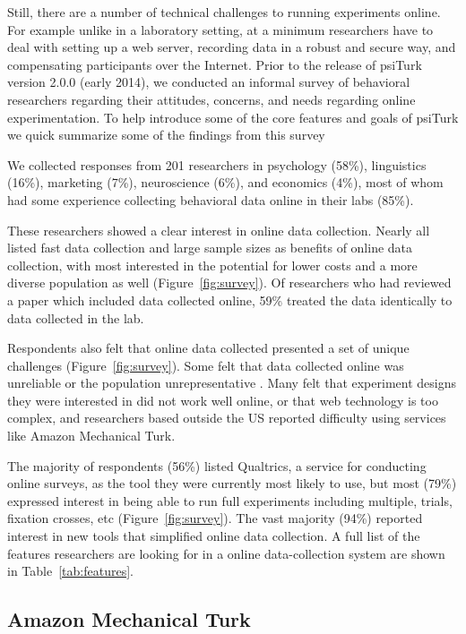 \documentclass[twocolumn]{svjour3}          %
\begin{document}
Still, there are a number of technical challenges to running experiments online.
For example unlike in a laboratory setting, at a minimum researchers have to 
deal with setting up a web server, recording data in a robust and secure way, 
and compensating participants over the Internet.  
Prior to the release of \textsf{psiTurk} version
2.0.0 (early 2014), we conducted an informal survey of behavioral researchers 
regarding their attitudes, concerns, and needs regarding online experimentation. 
To help introduce some of the core features and goals of \textsf{psiTurk} we 
quick summarize some of the findings from this survey

 We collected responses from 201 researchers in psychology (58\%),
linguistics (16\%), marketing (7\%), neuroscience (6\%), and economics (4\%), most of whom had some
experience collecting behavioral data online in their labs (85\%).

These researchers showed a clear interest in online data collection. Nearly all listed fast data
collection and large sample sizes as benefits of online data collection, with most
interested in the potential for lower costs and a more diverse population as well (Figure~\ref{fig:survey}). Of researchers who had reviewed a paper which included data collected online, 59\% treated the data identically to data collected in the lab.


Respondents also felt that online data collected presented a set of unique challenges (Figure~\ref{fig:survey}). 
Some felt that data collected online was unreliable or the
population unrepresentative . Many felt that experiment designs they were interested in did
not work well online, or that web technology is too complex, and researchers based
outside the US reported difficulty using services like Amazon Mechanical Turk.


The majority of respondents (56\%) listed Qualtrics, a service for conducting online surveys, as the tool they
were currently most likely to use, but most (79\%) expressed interest in being able to run full
experiments including multiple, trials, fixation crosses, etc (Figure~\ref{fig:survey}). The vast majority (94\%) reported
interest in new tools that simplified online data collection. A full list of the features researchers are looking for in a online data-collection system are shown in Table~\ref{tab:features}.


\subsection{Amazon Mechanical Turk} 
\end{document}
